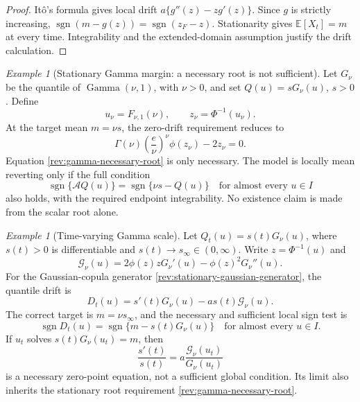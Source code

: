 \documentclass[11pt]{article}
\theoremstyle{remark}
\newtheorem{example}[definition]{Example}
\newcommand{\E}{\mathbb E}
\newcommand{\sgn}{\operatorname{sgn}}
\newcommand{\Gam}{\operatorname{Gamma}}
\begin{document}
\begin{proof}
It\^o's formula gives local drift
$a\{g''(z)-zg'(z)\}$.  Since $g$ is strictly increasing,
$\sgn(m-g(z))=\sgn(z_F-z)$.  Stationarity gives
$\E[X_t]=m$ at every time.  Integrability and the extended-domain assumption
justify the drift calculation.
\end{proof}

\begin{example}[Stationary Gamma margin: a necessary root is not sufficient]
\label{rev:ex-gamma-stationary}
Let $G_\nu$ be the quantile of $\Gam(\nu,1)$, with $\nu>0$, and set
$Q(u)=sG_\nu(u)$, $s>0$.  Define
\begin{equation}
u_\nu=F_{\nu,1}(\nu),\qquad z_\nu=\Phi^{-1}(u_\nu).
\label{rev:gamma-mean-quantile}
\end{equation}
At the target mean $m=\nu s$, the zero-drift requirement reduces to
\begin{equation}
\Gamma(\nu)\left(\frac e\nu\right)^\nu\phi(z_\nu)-2z_\nu=0.
\label{rev:gamma-necessary-root}
\end{equation}
Equation \eqref{rev:gamma-necessary-root} is only necessary.  The model is
locally mean reverting only if the full condition
\begin{equation}
\sgn\{\mathcal A Q(u)\}=\sgn\{\nu s-Q(u)\}
\quad\text{for almost every }u\in I
\label{rev:gamma-full-sign}
\end{equation}
also holds, with the required endpoint integrability.  No existence claim is
made from the scalar root alone.
\end{example}

\begin{example}[Time-varying Gamma scale]
\label{rev:ex-gamma-timevarying}
Let $Q_t(u)=s(t)G_\nu(u)$, where $s(t)>0$ is differentiable and
$s(t)\to s_\infty\in(0,\infty)$.  Write $z=\Phi^{-1}(u)$ and
\begin{equation}
\mathscr G_\nu(u)=2\phi(z)zG_\nu'(u)-\phi(z)^2G_\nu''(u).
\label{rev:gamma-G}
\end{equation}
For the Gaussian-copula generator \eqref{rev:stationary-gaussian-generator},
the quantile drift is
\begin{equation}
D_t(u)=s'(t)G_\nu(u)-a s(t)\mathscr G_\nu(u).
\label{rev:gamma-time-drift}
\end{equation}
The correct target is $m=\nu s_\infty$, and the necessary and sufficient local
sign test is
\begin{equation}
\sgn D_t(u)=\sgn\{m-s(t)G_\nu(u)\}
\quad\text{for almost every }u\in I.
\label{rev:gamma-time-full-sign}
\end{equation}
If $u_t$ solves $s(t)G_\nu(u_t)=m$, then
\begin{equation}
\frac{s'(t)}{s(t)}
=a\frac{\mathscr G_\nu(u_t)}{G_\nu(u_t)}
\label{rev:gamma-time-necessary-ode}
\end{equation}
is a necessary zero-point equation, not a sufficient global condition.  Its
limit also inherits the stationary root requirement
\eqref{rev:gamma-necessary-root}.
\end{example}
\end{document}
